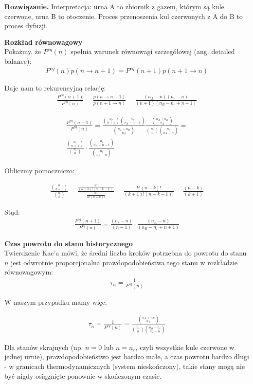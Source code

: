 \documentclass[11pt,a4paper]{article}
\newenvironment{solution}{\vspace{1cm} \par\textbf{Rozwiązanie.} \vspace{1cm}}{}
\begin{document}
\begin{solution}
Interpretacja: urna A to zbiornik z gazem, którym są kule czerwone,
urna B to otoczenie. Proces przenoszenia kul czerwonych z A do B to
proces dyfuzji.

\newpage
{\bf  Rozkład równowagowy}\\


Pokażmy, że  $P^{eq}(n)$ spełnia  warunek równowagi 
szczegółowej (ang. detailed balance):
\begin{align*}
  P^{eq}(n) p(n \to n+1) = P^{eq}(n+1) p(n+1 \to n)
\end{align*}

Daje nam to rekurencyjną relację:
\begin{align*}
  \frac{P^{eq}(n+1)}{P^{eq}(n)} = \frac{p(n \to n+1)}{p(n+1 \to n)}
                                  = \frac{(n_A - n)(n_r - n)}{(n+1)(n_B - n_r + n + 1)}
\end{align*}

\begin{align*}
\frac{P^{eq}(n+1)}{P^{eq}(n)} =
 \frac{\binom{n_r}{n+1}\binom{n_c}{n_A - n-1}}{\binom{n_A + n_B}{n_A}}
 \frac{\binom{n_A + n_B}{n_A}}{\binom{n_r}{n}\binom{n_c}{n_A - n}} = \\
  \frac{\binom{n_r}{n+1}}{\binom{n_r}{n}} \cdot
  \frac{\binom{n_c}{n_A - n-1}}{\binom{n_c}{n_A - n}} 
\end{align*}

Obliczmy pomoczniczo:

\begin{align*}
 \frac{\binom{n}{k+1}}{\binom{n}{k}} = 
 \frac{\frac{n!}{(k+1)!(n-k-1)!}}{\frac{n!}{k!(n-k)!}} =
 \frac{k!(n-k)!}{(k+1)!(n-k-1)!} =
 \frac{(n-k)}{(k+1)}
\end{align*}

Stąd:
\begin{align*}
  \frac{P^{eq}(n+1)}{P^{eq}(n)} =
  \frac{(n_r - n)}{(n+1)} \cdot
  \frac{(n_A - n)}{(n_B - n_r + n + 1)}
\end{align*}


\vspace{0.5cm}

{\bf Czas powrotu do stanu historycznego}\\

Twierdzenie Kac'a mówi, że średni liczba kroków potrzebna do powrotu do 
stanu $n$ jest odwrotnie proporcjonalna prawdopodobieństwa tego stanu w 
rozkładzie równowagowym:
\begin{align*}
  \tau_n = \frac{1}{P^{eq}(n)}
\end{align*}

W naszym przypadku mamy więc:

\begin{align*}
  \tau_n = \frac{1}{P^{eq}(n)} = \frac{\binom{n_A + n_B}{n_A}}{\binom{n_r}{n}\binom{n_B - n_r}{n_A - n}}
\end{align*}

Dla stanów skrajnych (np. $n=0$ lub $n=n_r$, czyli wszystkie kule czerwone 
w jednej urnie), prawdopodobieństwo jest bardzo małe, a czas powrotu bardzo długi - 
w granicach thermodynamicznych (system nieskończony), takie stany mogą nie być 
nigdy osiągnięte ponownie w skończonym czasie.

\newpage  
\end{solution}
\end{document}
